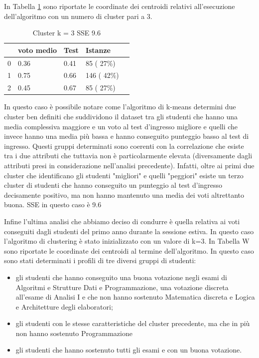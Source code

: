 \documentclass[12pt]{article}
\begin{document}
In Tabella \ref{c3MT} sono riportate le coordinate dei centroidi relativi all'esecuzione dell'algoritmo con un numero di cluster pari a 3.

\begin{table}[ht]
	\centering
	\caption{Cluster k = 3 SSE 9.6}
	\label{c3MT}
	\begin{tabular}{@{}lllll@{}}
	\toprule
	  & voto medio & Test  & Istanze\\ \midrule
	0 & 0.36       & 0.41  & 85  ( 27\%)\\
	1 & 0.75       & 0.66  & 146 ( 42\%)\\
	2 & 0.45       & 0.67  & 85  ( 27\%)\\ \bottomrule
	\end{tabular}
\end{table}

In questo caso è possibile notare come
l'algoritmo di k-means determini due cluster ben definiti che suddividono il dataset tra gli studenti che hanno una
media complessiva maggiore e un voto al test d'ingresso migliore e quelli che invece hanno una media più bassa e 
hanno conseguito punteggio basso al test di ingresso. Questi gruppi determinati sono coerenti con la correlazione 
che esiste tra i due attributi che tuttavia non è particolarmente elevata (diversamente dagli attributi presi in 
considerazione nell'analisi precedente). Infatti, oltre ai primi due cluster che identificano gli studenti "migliori"
e quelli "peggiori" esiste un terzo cluster di studenti che hanno conseguito un punteggio al test d'ingresso decisamente
positivo, ma non hanno mantenuto una media dei voti altrettanto buona. 
SSE in questo caso è 9.6

Infine l'ultima analisi che abbiamo deciso di condurre è quella relativa ai voti conseguiti dagli studenti del primo
anno durante la sessione estiva. In questo caso l'algoritmo di clustering è stato inizializzato con un valore di k=3.
In Tabella W sono riportate le coordinate dei centroidi al termine dell'algoritmo. In questo caso sono stati determinati
i profili di tre diversi gruppi di studenti:

\begin{itemize}
\item gli studenti che hanno conseguito una buona votazione negli esami di Algoritmi e Strutture Dati e Programmazione,
una votazione discreta all'esame di Analisi I e che non hanno sostenuto Matematica discreta e Logica e Architetture degli elaboratori;
\item gli studenti con le stesse caratteristiche del cluster precedente, ma che in più non hanno sostenuto Programmazione
\item gli studenti che hanno sostenuto tutti gli esami e con un buona votazione.
\end{itemize}
\end{document}
